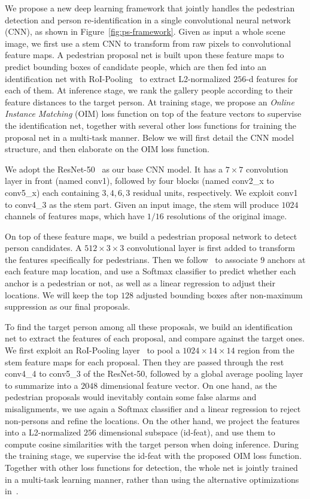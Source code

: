 We propose a new deep learning framework that jointly handles the pedestrian detection and person re-identification in a single convolutional neural network (CNN), as shown in Figure~\ref{fig:ps-framework}. Given as input a whole scene image, we first use a stem CNN to transform from raw pixels to convolutional feature maps. A pedestrian proposal net is built upon these feature maps to predict bounding boxes of candidate people, which are then fed into an identification net with RoI-Pooling~\cite{girshick2015fast} to extract L2-normalized $256$-d features for each of them. At inference stage, we rank the gallery people according to their feature distances to the target person. At training stage, we propose an \textit{Online Instance Matching} (OIM) loss function on top of the feature vectors to supervise the identification net, together with several other loss functions for training the proposal net in a multi-task manner. Below we will first detail the CNN model structure, and then elaborate on the OIM loss function.

We adopt the ResNet-50~\cite{he2015deep} as our base CNN model. It has a $7\times 7$ convolution layer in front (named conv1), followed by four blocks (named conv2\_x to conv5\_x) each containing $3, 4, 6, 3$ residual units, respectively. We exploit conv1 to conv4\_3 as the stem part. Given an input image, the stem will produce $1024$ channels of features maps, which have $1/16$ resolutions of the original image.

On top of these feature maps, we build a pedestrian proposal network to detect person candidates. A $512\times3\times3$ convolutional layer is first added to transform the features specifically for pedestrians. Then we follow~\cite{ren2015faster} to associate $9$ anchors at each feature map location, and use a Softmax classifier to predict whether each anchor is a pedestrian or not, as well as a linear regression to adjust their locations. We will keep the top $128$ adjusted bounding boxes after non-maximum suppression as our final proposals.

To find the target person among all these proposals, we build an identification net to extract the features of each proposal, and compare against the target ones. We first exploit an RoI-Pooling layer~\cite{girshick2015fast} to pool a $1024\times 14\times 14$ region from the stem feature maps for each proposal. Then they are passed through the rest conv4\_4 to conv5\_3 of the ResNet-50, followed by a global average pooling layer to summarize into a $2048$ dimensional feature vector. On one hand, as the pedestrian proposals would inevitably contain some false alarms and misalignments, we use again a Softmax classifier and a linear regression to reject non-persons and refine the locations. On the other hand, we project the features into a L2-normalized $256$ dimensional subspace (id-feat), and use them to compute cosine similarities with the target person when doing inference. During the training stage, we supervise the id-feat with the proposed OIM loss function. Together with other loss functions for detection, the whole net is jointly trained in a multi-task learning manner, rather than using the alternative optimizations in~\cite{ren2015faster}.


